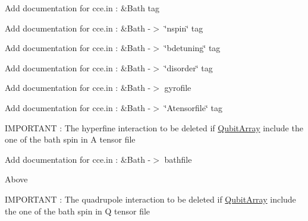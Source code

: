 
\begin{DoxyRefList}
\item[\label{todo__todo000012}%
\hypertarget{todo__todo000012}{}%
Member \hyperlink{structBathArray_a807633d8e314f488e12dfc95040ecc01}{Bath\-Array\-:\-:bath} ]Add documentation for cce.\-in \-: \&Bath tag  
\item[\label{todo__todo000011}%
\hypertarget{todo__todo000011}{}%
Member \hyperlink{structBathArray_ac71d275f6b9a2293d80fe8edf69fc46f}{Bath\-Array\-:\-:nspin} ]Add documentation for cce.\-in \-: \&Bath -\/$>$ \char`\"{}nspin\char`\"{} tag  
\item[\label{todo__todo000006}%
\hypertarget{todo__todo000006}{}%
Member \hyperlink{structBathSpin_a045005fcc1f5517a81e47e4a8b30e2f4}{Bath\-Spin\-:\-:detuning} ]Add documentation for cce.\-in \-: \&Bath -\/$>$ \char`\"{}bdetuning\char`\"{} tag  
\item[\label{todo__todo000007}%
\hypertarget{todo__todo000007}{}%
Member \hyperlink{structBathSpin_aad59ec954d15643047790f148dcca39b}{Bath\-Spin\-:\-:disorder} ]Add documentation for cce.\-in \-: \&Bath -\/$>$ \char`\"{}disorder\char`\"{} tag  
\item[\label{todo__todo000002}%
\hypertarget{todo__todo000002}{}%
Member \hyperlink{structBathSpin_a8c6487e73c2ef39b7a12d293ff5a1e4d}{Bath\-Spin\-:\-:gyro} ]Add documentation for cce.\-in \-: \&Bath -\/$>$ gyrofile  
\item[\label{todo__todo000008}%
\hypertarget{todo__todo000008}{}%
Member \hyperlink{structBathSpin_aad4ead2e39f4ae27fab5701662e7ee27}{Bath\-Spin\-:\-:hypf} ]Add documentation for cce.\-in \-: \&Bath -\/$>$ \char`\"{}\-Atensorfile\char`\"{} tag 

I\-M\-P\-O\-R\-T\-A\-N\-T \-: The hyperfine interaction to be deleted if \hyperlink{structQubitArray}{Qubit\-Array} include the one of the bath spin in A tensor file  
\item[\label{todo__todo000001}%
\hypertarget{todo__todo000001}{}%
Member \hyperlink{structBathSpin_a2158c37aefcd8093520106945f5f7463}{Bath\-Spin\-:\-:name} \mbox{[}M\-A\-X\-\_\-\-C\-H\-A\-R\-A\-R\-R\-A\-Y\-\_\-\-L\-E\-N\-G\-T\-H\mbox{]}]Add documentation for cce.\-in \-: \&Bath -\/$>$ bathfile  
\item[\label{todo__todo000009}%
\hypertarget{todo__todo000009}{}%
Member \hyperlink{structBathSpin_a304f556a5ba51a1275171e40d212d0d2}{Bath\-Spin\-:\-:quad} ]Above 

I\-M\-P\-O\-R\-T\-A\-N\-T \-: The quadrupole interaction to be deleted if \hyperlink{structQubitArray}{Qubit\-Array} include the one of the bath spin in Q tensor file 


\end{DoxyRefList}
